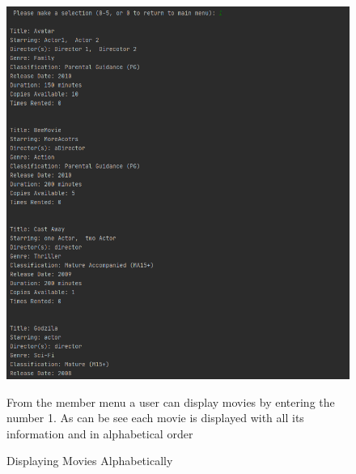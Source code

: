 \documentclass[a4paper,12pt]{article}
\begin{document}
\begin{figure}[!htb]
\centering
\includegraphics[width=1\textwidth]{7}
\caption{Displaying Movies Alphabetically}
\medskip
\small
From the member menu a user can display movies by entering the number 1. As can be see each movie is displayed with all its information and in alphabetical order
\end{figure}
\end{document}
